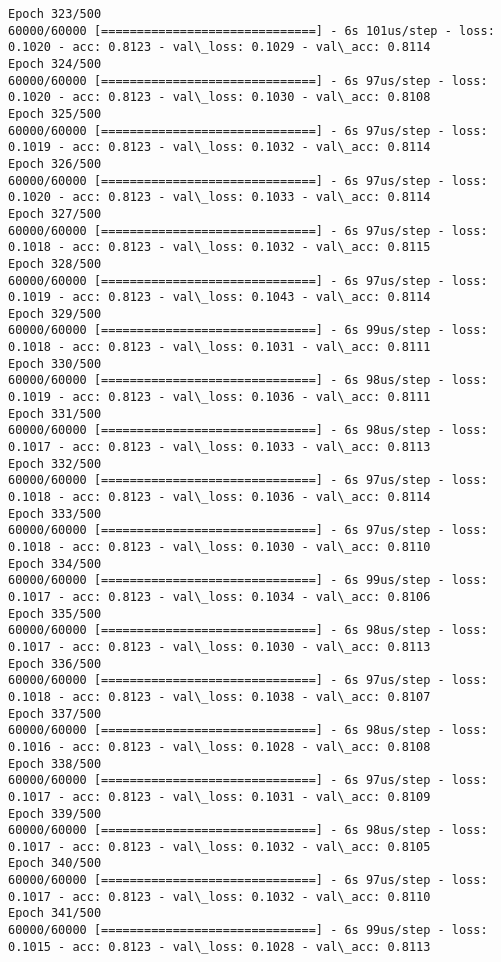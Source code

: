 \documentclass[11pt]{article}
\begin{document}
\begin{Verbatim}[commandchars=\\\{\}]
Epoch 323/500
60000/60000 [==============================] - 6s 101us/step - loss: 0.1020 - acc: 0.8123 - val\_loss: 0.1029 - val\_acc: 0.8114
Epoch 324/500
60000/60000 [==============================] - 6s 97us/step - loss: 0.1020 - acc: 0.8123 - val\_loss: 0.1030 - val\_acc: 0.8108
Epoch 325/500
60000/60000 [==============================] - 6s 97us/step - loss: 0.1019 - acc: 0.8123 - val\_loss: 0.1032 - val\_acc: 0.8114
Epoch 326/500
60000/60000 [==============================] - 6s 97us/step - loss: 0.1020 - acc: 0.8123 - val\_loss: 0.1033 - val\_acc: 0.8114
Epoch 327/500
60000/60000 [==============================] - 6s 97us/step - loss: 0.1018 - acc: 0.8123 - val\_loss: 0.1032 - val\_acc: 0.8115
Epoch 328/500
60000/60000 [==============================] - 6s 97us/step - loss: 0.1019 - acc: 0.8123 - val\_loss: 0.1043 - val\_acc: 0.8114
Epoch 329/500
60000/60000 [==============================] - 6s 99us/step - loss: 0.1018 - acc: 0.8123 - val\_loss: 0.1031 - val\_acc: 0.8111
Epoch 330/500
60000/60000 [==============================] - 6s 98us/step - loss: 0.1019 - acc: 0.8123 - val\_loss: 0.1036 - val\_acc: 0.8111
Epoch 331/500
60000/60000 [==============================] - 6s 98us/step - loss: 0.1017 - acc: 0.8123 - val\_loss: 0.1033 - val\_acc: 0.8113
Epoch 332/500
60000/60000 [==============================] - 6s 97us/step - loss: 0.1018 - acc: 0.8123 - val\_loss: 0.1036 - val\_acc: 0.8114
Epoch 333/500
60000/60000 [==============================] - 6s 97us/step - loss: 0.1018 - acc: 0.8123 - val\_loss: 0.1030 - val\_acc: 0.8110
Epoch 334/500
60000/60000 [==============================] - 6s 99us/step - loss: 0.1017 - acc: 0.8123 - val\_loss: 0.1034 - val\_acc: 0.8106
Epoch 335/500
60000/60000 [==============================] - 6s 98us/step - loss: 0.1017 - acc: 0.8123 - val\_loss: 0.1030 - val\_acc: 0.8113
Epoch 336/500
60000/60000 [==============================] - 6s 97us/step - loss: 0.1018 - acc: 0.8123 - val\_loss: 0.1038 - val\_acc: 0.8107
Epoch 337/500
60000/60000 [==============================] - 6s 98us/step - loss: 0.1016 - acc: 0.8123 - val\_loss: 0.1028 - val\_acc: 0.8108
Epoch 338/500
60000/60000 [==============================] - 6s 97us/step - loss: 0.1017 - acc: 0.8123 - val\_loss: 0.1031 - val\_acc: 0.8109
Epoch 339/500
60000/60000 [==============================] - 6s 98us/step - loss: 0.1017 - acc: 0.8123 - val\_loss: 0.1032 - val\_acc: 0.8105
Epoch 340/500
60000/60000 [==============================] - 6s 97us/step - loss: 0.1017 - acc: 0.8123 - val\_loss: 0.1032 - val\_acc: 0.8110
Epoch 341/500
60000/60000 [==============================] - 6s 99us/step - loss: 0.1015 - acc: 0.8123 - val\_loss: 0.1028 - val\_acc: 0.8113

\end{Verbatim}
\end{document}
